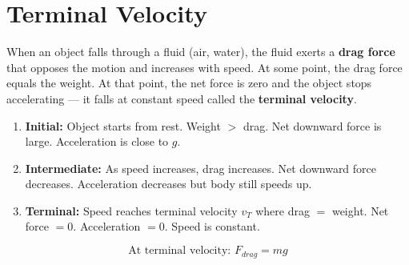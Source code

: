 \section{Terminal Velocity}

When an object falls through a fluid (air, water), the
fluid exerts a \textbf{drag force} that opposes the
motion and increases with speed. At some point, the drag
force equals the weight. At that point, the net force
is zero and the object stops accelerating --- it falls
at constant speed called the \textbf{terminal velocity}.

\begin{processbox}
\begin{enumerate}[noitemsep]
  \item \textbf{Initial:} Object starts from rest.
  Weight $> $ drag. Net downward force is large.
  Acceleration is close to $g$.
  \item \textbf{Intermediate:} As speed increases,
  drag increases. Net downward force decreases.
  Acceleration decreases but body still speeds up.
  \item \textbf{Terminal:} Speed reaches terminal
  velocity $v_T$ where drag $=$ weight.
  Net force $= 0$. Acceleration $= 0$.
  Speed is constant.
\end{enumerate}
\[
  \text{At terminal velocity: } F_{drag} = mg
\]
\end{processbox}

\begin{diagbox}
\begin{center}
\end{center}
\end{diagbox}

